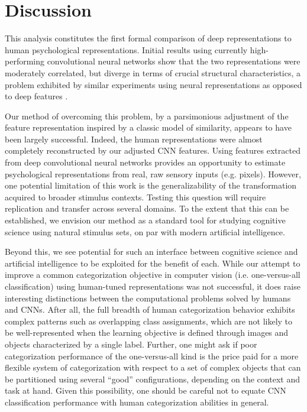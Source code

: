 \documentclass[10pt,letterpaper]{article}
\begin{document}
\section{Discussion}
This analysis constitutes the first formal comparison of deep representations to human psychological representations. Initial results using currently high-performing convolutional neural networks show that the two representations were moderately correlated, but diverge in terms of crucial structural characteristics, a problem exhibited by similar experiments using neural representations as opposed to deep features \citep*{mur_human_2013}.

Our method of overcoming this problem, by a parsimonious adjustment of the feature representation inspired by a classic model of similarity, appears to have been largely successful. Indeed, the human representations were almost completely reconstructed by our adjusted CNN features. Using features extracted from deep convolutional neural networks provides an opportunity to estimate psychological representations from real, raw sensory inputs (e.g. pixels). However, one potential limitation of this work is the generalizability of the transformation acquired to broader stimulus contexts. Testing this question will require replication and transfer across several domains. To the extent that this can be established, we envision our method as a standard tool for studying cognitive science using natural stimulus sets, on par with modern artificial intelligence.

Beyond this, we see potential for such an interface between cognitive science and artificial intelligence to be exploited for the benefit of each. While our attempt to improve a common categorization objective in computer vision (i.e. one-versus-all classification) using human-tuned representations was not successful, it does raise interesting distinctions between the computational problems solved by humans and CNNs. After all, the full breadth of human categorization behavior exhibits complex patterns such as overlapping class assignments, which are not likely to be well-represented when the learning objective is defined through images and objects characterized by a single label. Further, one might ask if poor categorization performance of the one-versus-all kind is the price paid for a more flexible system of categorization with respect to a set of complex objects that can be partitioned using several ``good'' configurations, depending on the context and task at hand. Given this possibility, one should be careful not to equate CNN classification performance with human categorization abilities in general.
\nocite{afkham2008joint}
\nocite{agrawal_pixels_2014}
\nocite{austerweil_nonparametric_2013}
\nocite{he2015delving}
\nocite{jia2014caffe}
\nocite{khaligh-razavi_deep_2014}
\nocite{krizhevsky2012imagenet}
\nocite{lake_deep_2015}
\nocite{lecun1989backpropagation}
\nocite{mur_human_2013}
\nocite{ICCV15_ObjectMemorability}
\nocite{sainath2013learning}
\nocite{shepard1979additive}
\nocite{simonyan2014very}
\nocite{szegedy2013intriguing}
\nocite{szegedy2014going}
\nocite{yamins2014performance}
\nocite{bengio2009learning}
\nocite{lecun2015deep}
\end{document}
